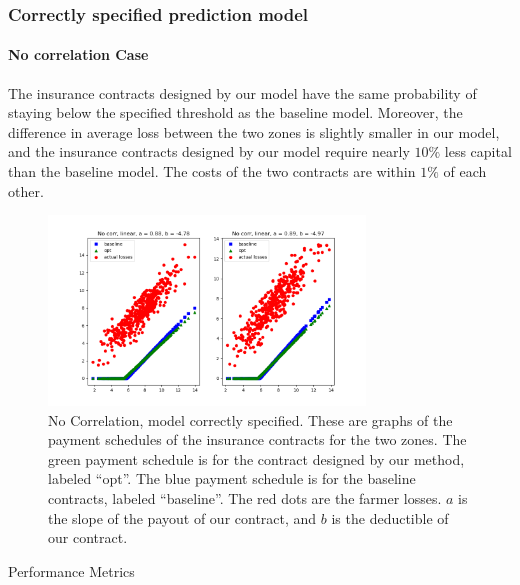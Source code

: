 \documentclass[11pt]{article}
\begin{document}
    \subsubsection{Correctly specified prediction model}
      \paragraph{No correlation Case} The insurance contracts designed by our model have the same probability of staying below the specified threshold as the baseline model. Moreover, the difference in average loss between the two zones is slightly smaller in our model, and the insurance contracts designed by our model require nearly $10\%$ less capital than the baseline model. The costs of the two contracts are within $1\%$ of each other. 
      \begin{figure}[H]
          \centering
          \includegraphics[width=0.75\textwidth]{../../output/figures/Exploration/no_correlation_linear.png}
          \caption{No Correlation, model correctly specified. These are graphs of the payment schedules of the insurance contracts for the two zones. The green payment schedule is for the contract designed by our method, labeled ``opt''. The blue payment schedule is for the baseline contracts, labeled ``baseline''. The red dots are the farmer losses. $a$ is the slope of the payout of our contract, and $b$ is the deductible of our contract.}
      \end{figure}

      \begin{table}[H]
          \centering
          \small
          \caption{Performance Metrics}
          
      \end{table}
      \FloatBarrier
\end{document}
